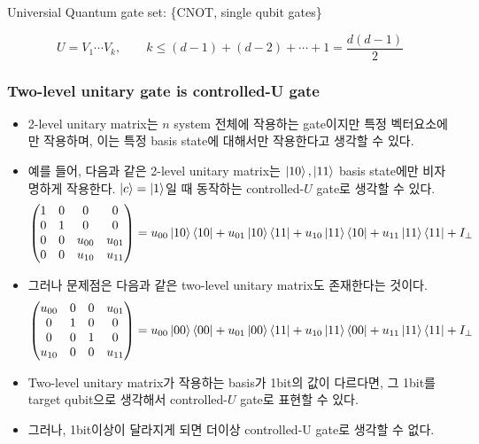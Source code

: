 \documentclass[9pt]{beamer}
\begin{document}
\begin{section}{Universial Quantum gate set: \{CNOT, single qubit gates\}}
\begin{frame}
\begin{itemize}
                    $$ U= V_1 \cdots V_k, \qquad k \le (d-1) + (d-2) + \cdots + 1 = \frac{d(d-1)}{2}$$
                    \vspace{-0.7cm}
                \end{itemize}        
        \end{frame}

        \begin{frame}
            \frametitle{Two-level unitary gate is controlled-U gate}
                \begin{itemize}
                    \item 2-level unitary matrix는 $n$ system 전체에 작용하는 gate이지만 특정 벡터요소에만 작용하며, 이는 특정 \alert{basis state}에 대해서만 작용한다고 생각할 수 있다. 
                    \item 예를 들어, 다음과 같은 2-level unitary matrix는 $\ket{10}, \ket{11}$ basis state에만 비자명하게 작용한다. $\ket{c} = \ket{1}$일 때 동작하는 controlled-$U$ gate로 생각할 수 있다.
                    $$ \begin{pmatrix} 1 & 0  & 0 & 0 \\ 0 & 1 & 0 & 0\\ 0 & 0 & u_{00} &  u_{01}  \\0 & 0 & u_{10} & u_{11} \\ \end{pmatrix}  =u_{00} \ket{10}\bra{10} + u_{01}\ket{10}\bra{11} +u_{10} \ket{11}\bra{10}+ u_{11} \ket{11}\bra{11} + I_{\perp}$$
                    \item 그러나 문제점은 다음과 같은 two-level unitary matrix도 존재한다는 것이다. 
                    $$ \begin{pmatrix} u_{00} & 0  & 0 & u_{01} \\ 0 & 1 & 0 & 0\\ 0 & 0 & 1 &  0 \\ u_{10} & 0 & 0 & u_{11} \\ \end{pmatrix}  =u_{00} \ket{00}\bra{00} + u_{01}\ket{00}\bra{11} +u_{10} \ket{11}\bra{00}+ u_{11} \ket{11}\bra{11} + I_{\perp}$$
                    \item Two-level unitary matrix가 작용하는 basis가 1bit의 값이 다르다면, 그 1bit를 target qubit으로 생각해서 controlled-$U$ gate로 표현할 수 있다.
                    \item 그러나, 1bit이상이 달라지게 되면 더이상 controlled-U gate로 생각할 수 없다.
                \end{itemize}
                

\end{frame}
\end{section}
\end{document}
